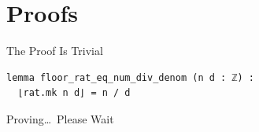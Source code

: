 \documentclass{beamer}
\begin{document}
\section{Proofs}
\begin{frame}[fragile]{The Proof Is Trivial}
\begin{verbatim}
lemma floor_rat_eq_num_div_denom (n d : ℤ) :
  ⌊rat.mk n d⌋ = n / d
\end{verbatim}

\vspace{10mm}
\end{frame}
\begin{frame}[fragile]{Proving\dots\ Please Wait}
\end{frame}
\end{document}
